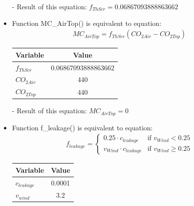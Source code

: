 \documentclass[a4paper]{article}
\begin{document}
\begin{itemize}
  \item[-] Result of this equation: \(f_{ThScr} = 0.06867093888863662\)

  \item Function MC\_AirTop() is equivalent to equation:
        \begin{align*}
          MC_{AirTop} = f_{ThScr} (CO_{2 Air} - CO_{2 Top})
        \end{align*}

        \begin{table}[H]
          \centering
          \begin{tabular}{@{}lS[table-format=3.16]@{}}
            \toprule
            \textbf{Variable} & \textbf{Value}      \\
            \midrule
            \(f_{ThScr}\)     & 0.06867093888863662 \\
            \(CO_{2 Air}\)    & 440                 \\
            \(CO_{2 Top}\)    & 440                 \\
            \bottomrule
          \end{tabular}
        \end{table}

  \item[-] Result of this equation: \(MC_{AirTop} = 0\)

  \item Function f\_leakage() is equivalent to equation:
        \begin{align*}
          f_{leakage} = \begin{cases}
            0.25 \cdot c_{leakage}     & \text{if~} v_{Wind} < 0.25    \\
            v_{Wind} \cdot c_{leakage} & \text{if~} v_{Wind} \geq 0.25
          \end{cases}
        \end{align*}

        \begin{table}[H]
          \centering
          \begin{tabular}{@{}lS[table-format=1.4]@{}}
            \toprule
            \textbf{Variable} & \textbf{Value} \\
            \midrule
            \(c_{leakage}\)   & 0.0001         \\
            \(v_{wind}\)      & 3.2            \\
            \bottomrule
          \end{tabular}
        \end{table}


\end{itemize}
\end{document}
